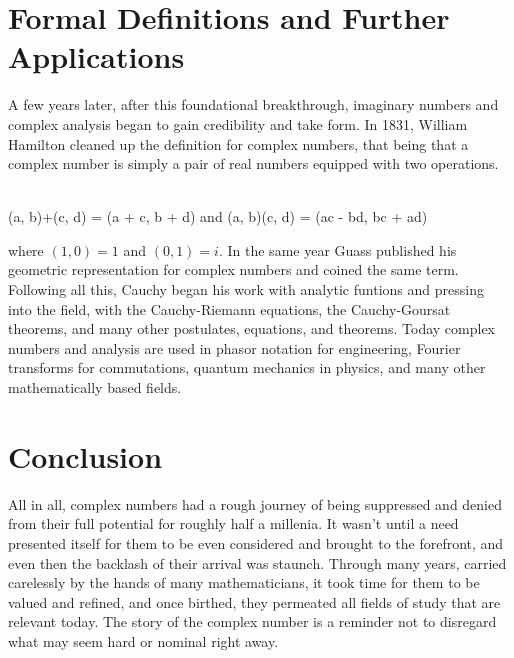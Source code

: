 \documentclass[12pt]{article}
\newcommand{\bbr}{\mathbb{R}}
\begin{document}
\section{Formal Definitions and Further Applications}
\hspace{\parindent}A few years later, after this foundational breakthrough, imaginary numbers and complex analysis began to gain credibility and take form. In 1831, William Hamilton cleaned up the definition for complex numbers, that being that a complex number is simply a pair of real numbers equipped with two operations. 
\begin{center}
    \bbr \times \bbr \to {}\\
    (a, b)+(c, d) = (a + c, b + d) and (a, b)(c, d) = (ac - bd, bc + ad)
\end{center}
where $(1,0)=1$ and $(0,1)=i$. In the same year Guass published his geometric representation for complex numbers and coined the same term. Following all this, Cauchy began his work with analytic funtions and pressing into the field, with the Cauchy-Riemann equations, the Cauchy-Goursat theorems, and many other postulates, equations, and theorems. Today complex numbers and analysis are used in phasor notation for engineering, Fourier transforms for commutations, quantum mechanics in physics, and many other mathematically based fields. 

\section{Conclusion}
All in all, complex numbers had a rough journey of being suppressed and denied from their full potential for roughly half a millenia. It wasn't until a need presented itself for them to be even considered and brought to the forefront, and even then the backlash of their arrival was staunch. Through many years, carried carelessly by the hands of many mathematicians, it took time for them to be valued and refined, and once birthed, they permeated all fields of study that are relevant today. The story of the complex number is a reminder not to disregard what may seem hard or nominal right away. 
\end{document}
